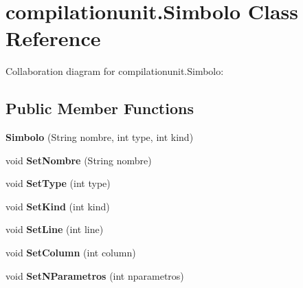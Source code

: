 \hypertarget{classcompilationunit_1_1_simbolo}{
\section{compilationunit.Simbolo Class Reference}
\label{classcompilationunit_1_1_simbolo}
}


Collaboration diagram for compilationunit.Simbolo:
\subsection*{Public Member Functions}
\begin{DoxyCompactItemize}
\item 
\hypertarget{classcompilationunit_1_1_simbolo_a26bd95e8721b3e39e6354f57b6188145}{
{\bfseries Simbolo} (String nombre, int type, int kind)}
\label{classcompilationunit_1_1_simbolo_a26bd95e8721b3e39e6354f57b6188145}

\item 
\hypertarget{classcompilationunit_1_1_simbolo_a2236c1bed6efbeb35f2e9e44f0ac17f1}{
void {\bfseries SetNombre} (String nombre)}
\label{classcompilationunit_1_1_simbolo_a2236c1bed6efbeb35f2e9e44f0ac17f1}

\item 
\hypertarget{classcompilationunit_1_1_simbolo_a0a6ff56c7a1c3d916c91dd5c758bec44}{
void {\bfseries SetType} (int type)}
\label{classcompilationunit_1_1_simbolo_a0a6ff56c7a1c3d916c91dd5c758bec44}

\item 
\hypertarget{classcompilationunit_1_1_simbolo_a7e1ea284a391ef76eff34255eeac35b9}{
void {\bfseries SetKind} (int kind)}
\label{classcompilationunit_1_1_simbolo_a7e1ea284a391ef76eff34255eeac35b9}

\item 
\hypertarget{classcompilationunit_1_1_simbolo_ad59e69d8765bfc1dbfaba33cde309b2c}{
void {\bfseries SetLine} (int line)}
\label{classcompilationunit_1_1_simbolo_ad59e69d8765bfc1dbfaba33cde309b2c}

\item 
\hypertarget{classcompilationunit_1_1_simbolo_a6635d13173ddfe5eac14c099f275eb74}{
void {\bfseries SetColumn} (int column)}
\label{classcompilationunit_1_1_simbolo_a6635d13173ddfe5eac14c099f275eb74}

\item 
\hypertarget{classcompilationunit_1_1_simbolo_aaf4f85e9856d2377844d6a419de6ffe9}{
void {\bfseries SetNParametros} (int nparametros)}
\label{classcompilationunit_1_1_simbolo_aaf4f85e9856d2377844d6a419de6ffe9}


\end{DoxyCompactItemize}
